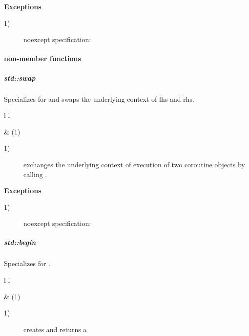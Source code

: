 {\bf Exceptions}
\begin{description}
    \item[1)] noexcept specification: \\
\end{description}

\paragraph*{non-member functions}
\subparagraph*{std::swap}
Specializes  for \pushcoro and swaps the underlying context of
lhs and rhs.\\

\begin{tabular}{ l l }
    \midrule

     & (1)\\

    \midrule
\end{tabular}

\begin{description}
    \item[1)] exchanges the underlying context of execution of two coroutine
              objects by calling .\\
\end{description}

{\bf Exceptions}
\begin{description}
    \item[1)] noexcept specification: \\
\end{description}

\subparagraph*{std::begin}
Specializes  for \pushcoro.\\

\begin{tabular}{ l l }
    \midrule

     & (1)\\

    \midrule
\end{tabular}

\begin{description}
    \item[1)] creates and returns a \\
\end{description}

